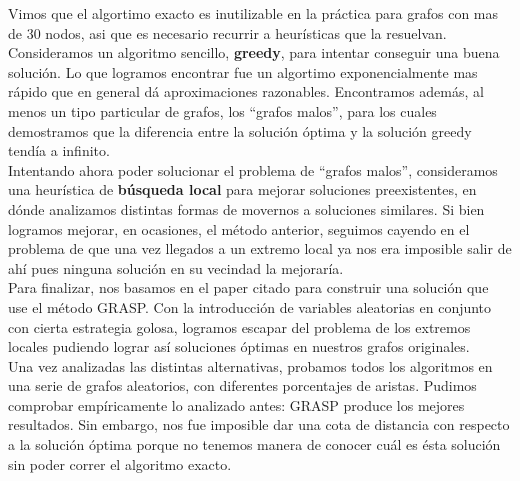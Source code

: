 Vimos que el algortimo exacto es inutilizable en la práctica para grafos con mas de 30 nodos, asi que es necesario recurrir a heurísticas que la resuelvan. \\

Consideramos un algoritmo sencillo, \textbf{greedy}, para intentar conseguir una buena solución. Lo que logramos encontrar fue un algortimo exponencialmente mas rápido que en general dá aproximaciones razonables. Encontramos además, al menos un tipo particular de grafos, los ``grafos malos'', para los cuales demostramos que la diferencia entre la solución óptima y la solución greedy tendía a infinito. \\

Intentando ahora poder solucionar el problema de ``grafos malos'', consideramos una heurística de \textbf{búsqueda local} para mejorar soluciones preexistentes, en dónde analizamos distintas formas de movernos a soluciones similares. Si bien logramos mejorar, en ocasiones, el método anterior, seguimos cayendo en el problema de que una vez llegados a un extremo local ya nos era imposible salir de ahí pues ninguna solución en su vecindad la mejoraría. \\

Para finalizar, nos basamos en el paper citado \cite{paper_grasp} para construir una solución que use el método GRASP. Con la introducción de variables aleatorias en conjunto con cierta estrategia golosa, logramos escapar del problema de los extremos locales pudiendo lograr así soluciones óptimas en nuestros grafos originales.  \\

Una vez analizadas las distintas alternativas, probamos todos los algoritmos en una serie de grafos aleatorios, con diferentes porcentajes de aristas. Pudimos comprobar empíricamente lo analizado antes: GRASP produce los mejores resultados. Sin embargo, nos fue imposible dar una cota de distancia con respecto a la solución óptima porque no tenemos manera de conocer cuál es ésta solución sin poder correr el algoritmo exacto. \\